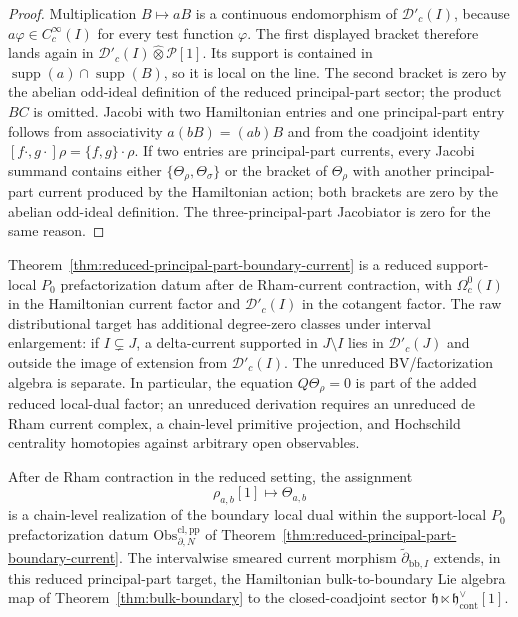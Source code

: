 \documentclass[11pt]{memoir}
\begin{document}
\begin{proof}
  Multiplication \(B\mapsto aB\) is a continuous endomorphism of
  \(\mathcal D'_c(I)\), because \(a\varphi\in C^\infty_c(I)\) for every
  test function \(\varphi\).  The first displayed bracket therefore
  lands again in \(\mathcal D'_c(I)\widehat\otimes\mathcal P[1]\).  Its
  support is contained in
  \(\operatorname{supp}(a)\cap\operatorname{supp}(B)\), so it is local
  on the line.  The second bracket is zero by the abelian odd-ideal
  definition of the reduced principal-part sector; the product \(BC\) is
  omitted.  Jacobi with two Hamiltonian entries and one
  principal-part entry follows from associativity
  \(a(bB)=(ab)B\) and from the coadjoint identity
  \([f\cdot,g\cdot]\rho=\{f,g\}\cdot\rho\).  If two entries are
  principal-part currents, every Jacobi summand contains either
  \(\{\Theta_\rho,\Theta_\sigma\}\) or the bracket of
  \(\Theta_\rho\) with another principal-part current produced by the
  Hamiltonian action; both brackets are zero by the abelian odd-ideal
  definition.  The three-principal-part Jacobiator is zero for the same
  reason.
\end{proof}

\begin{rmk}\label{rmk:reduced-principal-part-currents}
	  Theorem~\ref{thm:reduced-principal-part-boundary-current} is a reduced
	  support-local \(P_0\) prefactorization datum after de Rham-current
  contraction, with \(\Omega_c^0(I)\) in the Hamiltonian current factor
  and \(\mathcal D'_c(I)\) in the cotangent factor.  The raw
  distributional target has additional degree-zero classes under interval
  enlargement: if \(I\subsetneq J\), a delta-current supported in
  \(J\setminus I\) lies in \(\mathcal D'_c(J)\) and outside the image of
  extension from \(\mathcal D'_c(I)\).  The unreduced BV/factorization
  algebra is separate. In particular, the equation $Q\Theta_\rho=0$
  is part of the added reduced local-dual factor; an unreduced derivation
  requires an unreduced de Rham current complex, a chain-level primitive
  projection, and Hochschild centrality homotopies against arbitrary open
  observables.
\end{rmk}

\begin{thm}\label{thm:boundary-principal-part-cotangent-operators}
  After de Rham contraction in the reduced setting, the assignment
  $$\rho_{a,b}[1]\longmapsto\Theta_{a,b}$$
  is a chain-level realization of the boundary local dual within the
  support-local \(P_0\) prefactorization datum
  $\mathrm{Obs}_{\partial,N}^{\mathrm{cl,pp}}$ of
  Theorem~\ref{thm:reduced-principal-part-boundary-current}. The
  intervalwise smeared current morphism
  $\widetilde\partial_{\mathrm{bb},I}$ extends, in this reduced
  principal-part target, the Hamiltonian bulk-to-boundary Lie algebra map
  of Theorem~\ref{thm:bulk-boundary} to the closed-coadjoint sector
  $\mathfrak h\ltimes\mathfrak h^{\vee}_{\mathrm{cont}}[1]$.
\end{thm}
\end{document}
